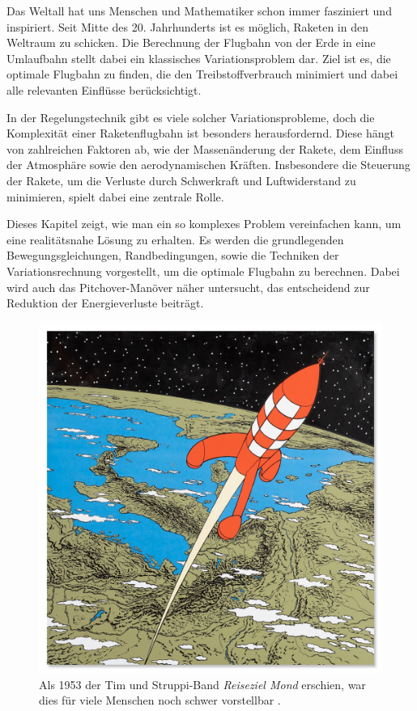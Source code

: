 %
%
%
%

Das Weltall hat uns Menschen und Mathematiker schon immer fasziniert und inspiriert. 
Seit Mitte des 20. Jahrhunderts ist es möglich, Raketen in den Weltraum zu schicken. 
Die Berechnung der Flugbahn von der Erde in eine Umlaufbahn stellt dabei ein klassisches Variationsproblem dar. 
Ziel ist es, die optimale Flugbahn zu finden, die den Treibstoffverbrauch minimiert und dabei alle relevanten Einflüsse berücksichtigt.

In der Regelungstechnik gibt es viele solcher Variationsprobleme, doch die Komplexität einer Raketenflugbahn ist besonders herausfordernd. 
Diese hängt von zahlreichen Faktoren ab, wie der Massenänderung der Rakete, dem Einfluss der Atmosphäre sowie den aerodynamischen Kräften. 
Insbesondere die Steuerung der Rakete, um die Verluste durch Schwerkraft und Luftwiderstand zu minimieren, spielt dabei eine zentrale Rolle.

Dieses Kapitel zeigt, wie man ein so komplexes Problem vereinfachen kann, um eine realitätsnahe Lösung zu erhalten. 
Es werden die grundlegenden Bewegungsgleichungen, Randbedingungen, sowie die Techniken der Variationsrechnung vorgestellt, um die optimale Flugbahn zu berechnen. 
Dabei wird auch das Pitchover-Manöver näher untersucht, das entscheidend zur Reduktion der Energieverluste beiträgt. 

\begin{figure}
	\centering
	\includegraphics[width=0.6\linewidth]{papers/leo/Grafiken/raketen_typen.jpg}
	\caption{Als 1953 der Tim und Struppi-Band {\em Reiseziel Mond} erschien, war dies für viele Menschen noch schwer vorstellbar \cite{leo:timstruppi}.}
	\label{fig:leo:raketen_typen}
\end{figure}







